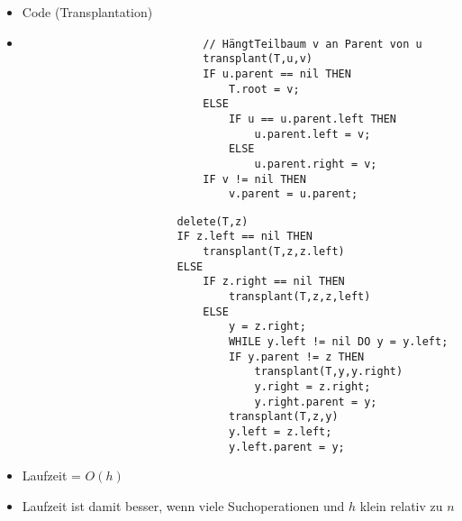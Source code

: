\begin{itemize}
\begin{itemize}
                \item Code (Transplantation)
                \item[]
                    \begin{minipage}{0.45\textwidth}
                            \begin{verbatim}
                            // HängtTeilbaum v an Parent von u
                            transplant(T,u,v) 
                            IF u.parent == nil THEN
                                T.root = v;
                            ELSE
                                IF u == u.parent.left THEN
                                    u.parent.left = v;
                                ELSE 
                                    u.parent.right = v;
                            IF v != nil THEN
                                v.parent = u.parent;
                            \end{verbatim}
                    \end{minipage}
                    \begin{minipage}{0.45\textwidth}
                        \begin{verbatim}
                        delete(T,z)
                        IF z.left == nil THEN
                            transplant(T,z,z.left)
                        ELSE
                            IF z.right == nil THEN
                                transplant(T,z,z,left)
                            ELSE
                                y = z.right;
                                WHILE y.left != nil DO y = y.left;
                                IF y.parent != z THEN
                                    transplant(T,y,y.right)
                                    y.right = z.right;
                                    y.right.parent = y;
                                transplant(T,z,y)
                                y.left = z.left;
                                y.left.parent = y;
                        \end{verbatim}
                    \end{minipage}
                \item Laufzeit = $O(h)$
                \item Laufzeit ist damit besser, wenn viele Suchoperationen und $h$ klein relativ zu $n$
            \end{itemize}


\end{itemize}
